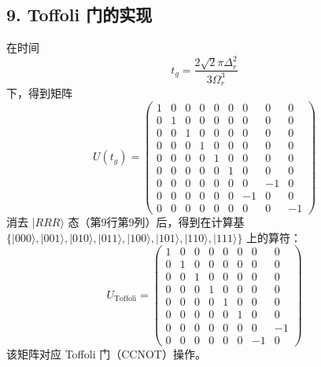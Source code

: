\documentclass[12pt]{article}
\begin{document}
	\subsection*{9. Toffoli 门的实现}
	在时间
	\begin{equation}
		t_g = \frac{2\sqrt{2}\pi\Delta_r^2}{3\Omega_r^3}
	\end{equation}
	下，得到矩阵
	\begin{equation}
		U(t_g) = 
		\begin{pmatrix}
			1 & 0 & 0 & 0 & 0 & 0 & 0 & 0 & 0 \\
			0 & 1 & 0 & 0 & 0 & 0 & 0 & 0 & 0 \\
			0 & 0 & 1 & 0 & 0 & 0 & 0 & 0 & 0 \\
			0 & 0 & 0 & 1 & 0 & 0 & 0 & 0 & 0 \\
			0 & 0 & 0 & 0 & 1 & 0 & 0 & 0 & 0 \\
			0 & 0 & 0 & 0 & 0 & 1 & 0 & 0 & 0 \\
			0 & 0 & 0 & 0 & 0 & 0 & 0 & -1 & 0 \\
			0 & 0 & 0 & 0 & 0 & 0 & -1 & 0 & 0 \\
			0 & 0 & 0 & 0 & 0 & 0 & 0 & 0 & -1
		\end{pmatrix}
	\end{equation}
	消去 $|RRR\rangle$ 态（第9行第9列）后，得到在计算基 $\{|000\rangle, |001\rangle, |010\rangle, |011\rangle, |100\rangle, |101\rangle, |110\rangle, |111\rangle\}$ 上的算符：
	\begin{equation}
		U_{\text{Toffoli}} = 
		\begin{pmatrix}
			1 & 0 & 0 & 0 & 0 & 0 & 0 & 0 \\
			0 & 1 & 0 & 0 & 0 & 0 & 0 & 0 \\
			0 & 0 & 1 & 0 & 0 & 0 & 0 & 0 \\
			0 & 0 & 0 & 1 & 0 & 0 & 0 & 0 \\
			0 & 0 & 0 & 0 & 1 & 0 & 0 & 0 \\
			0 & 0 & 0 & 0 & 0 & 1 & 0 & 0 \\
			0 & 0 & 0 & 0 & 0 & 0 & 0 & -1 \\
			0 & 0 & 0 & 0 & 0 & 0 & -1 & 0
		\end{pmatrix}
	\end{equation}
	该矩阵对应 Toffoli 门（CCNOT）操作。
	
\end{document}

